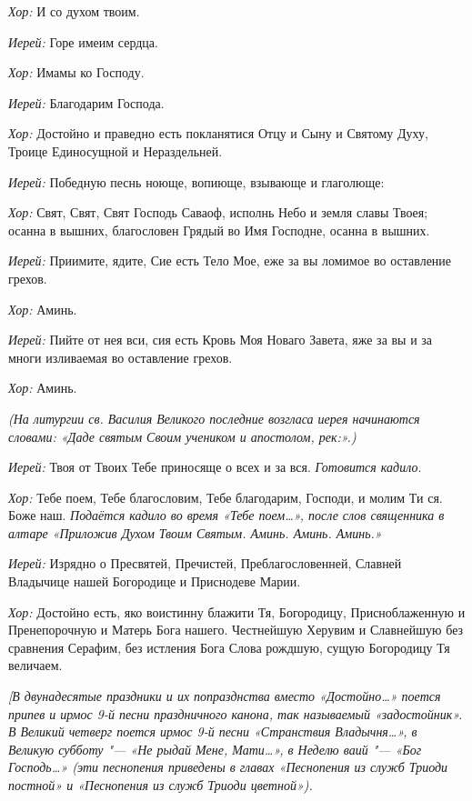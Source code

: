 \begin{mymulticols}
{\itshape Хор:} И со духом твоим. 

{\itshape Иерей:} Горе имеим сердца. 

{\itshape Хор:} Имамы ко Господу. 

{\itshape Иерей:} Благодарим Господа. 

{\itshape Хор:} Достойно и праведно есть покланятися Отцу и Сыну и Святому Духу, Троице Единосущной и Нераздельней.

{\itshape Иерей:} Победную песнь ноюще, вопиюще, взывающе и глаголюще:

{\itshape Хор:} Свят, Свят, Свят Господь Саваоф, исполнь Небо и земля славы Твоея; осанна в вышних, благословен Грядый во Имя Господне, осанна в вышних.

{\itshape Иерей:} Приимите, ядите, Сие есть Тело Мое, еже за вы ломимое во оставление грехов.

{\itshape Хор:} Аминь.

{\itshape Иерей:} Пийте от нея вси, сия есть Кровь Моя Новаго Завета, яже за вы и за многи изливаемая во оставление грехов.

{\itshape Хор:} Аминь. 

{\itshape (На литургии св. Василия Великого последние возгласа иерея начинаются словами: «Даде святым Своим учеником и апостолом, рек:».)}

{\itshape Иерей:} Твоя от Твоих Тебе приносяще о всех и за вся.  {\itshape Готовится кадило}.

{\itshape Хор:} Тебе поем, Тебе благословим, Тебе благодарим, Господи, и молим Ти ся. Боже наш.  {\itshape Подаётся кадило во время «Тебе поем…», после слов священника в алтаре «Приложив Духом Твоим Святым. Аминь. Аминь. Аминь.»}

{\itshape Иерей:} Изрядно о Пресвятей, Пречистей, Преблагословенней, Славней Владычице нашей Богородице и Приснодеве Марии.

{\itshape Хор:} Достойно есть, яко воистинну блажити Тя, Богородицу, Присноблаженную и Пренепорочную и Матерь Бога нашего. Честнейшую Херувим и Славнейшую без сравнения Серафим, без истления Бога Слова рождшую, сущую Богородицу Тя величаем. 

{\itshape [В двунадесятые праздники и их попразднства вместо «Достойно…» поется припев и ирмос 9-й песни праздничного канона, так называемый «задостойник». В Великий четверг поется ирмос 9-й песни «Странствия Владычня…», в Великую субботу "--- «Не рыдай Мене, Мати…», в Неделю ваий "--- «Бог Господь…» (эти песнопения приведены в главах «Песнопения из служб Триоди постной» и «Песнопения из служб Триоди цветной»).

}
\end{mymulticols}
